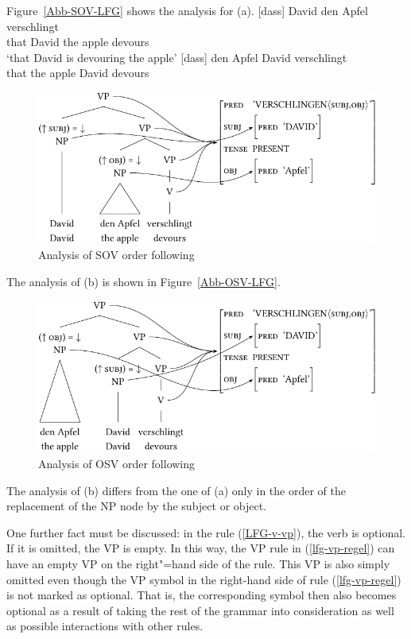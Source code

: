 Figure~\vref{Abb-SOV-LFG} shows the analysis for (a). 
\eal
\ex 
\gll {}[dass] David den Apfel verschlingt\\
      \spacebr{}that David the apple devours\\
\glt `that David is devouring the apple'
\ex 
\gll {}[dass] den Apfel David verschlingt\\
     \spacebr{}that the apple David devours\\
\zl
\begin{figure}
\centerline{%
\includegraphics{Figures/david-den-apfel-verschlingt-lfg-lsp-crop}
}
\caption{\label{Abb-SOV-LFG}Analysis of SOV order following \citet{Berman96a-u}}
\end{figure}%
The analysis of (b) is shown in Figure~\vref{Abb-OSV-LFG}.
\begin{figure}
\centerline{%
\includegraphics{Figures/den-apfel-david-verschlingt-lfg-lsp-crop}
}
\caption{\label{Abb-OSV-LFG}Analysis of OSV order following \citet{Berman96a-u}}
\end{figure}%
The analysis of (b) differs from the one of (a) only in the order of the replacement
of the NP node by the subject or object.

One further fact must be discussed: in the rule (\ref{LFG-v-vp}), the verb is optional. If it is
omitted, the VP is empty. In this way, the VP rule in (\ref{lfg-vp-regel}) can have an empty VP on
the right"=hand side of the rule. This VP is also simply
omitted even though the VP symbol in the right-hand side of rule (\ref{lfg-vp-regel})  is not marked as optional.
That is, the corresponding symbol then also becomes optional as a result of taking the rest of the grammar into consideration as well as possible interactions with
other rules.  

